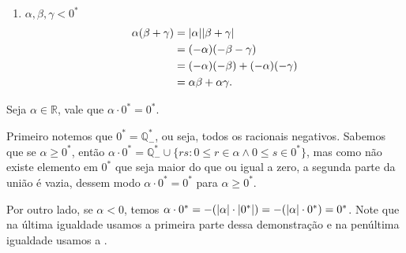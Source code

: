 \documentclass[../main.tex]{subfiles}
\begin{document}
\begin{dem}
\begin{enumerate}
        \item $\alpha,\beta,\gamma < 0^*$
        \begin{align*}
            \alpha(\beta+\gamma) &= \abs{\alpha}\abs{\beta+\gamma} \\
            &= (-\alpha)(-\beta-\gamma) \\
            &= (-\alpha)(-\beta) + (-\alpha)(-\gamma) \\
            &= \alpha\beta + \alpha\gamma.
        \end{align*}
    \end{enumerate}
\end{dem}

\begin{teo}
    Seja $\alpha \in \mathbb{R}$, vale que $\alpha \cdot 0^* = 0^*$.
\end{teo}
\begin{dem}
    Primeiro notemos que $0^* = \mathbb{Q}_{-}^*$, ou seja, todos os racionais negativos. Sabemos que se $\alpha \geq 0^*$, 
    então $\alpha \cdot 0^* = \mathbb{Q}_{-}^* \cup \{ rs : 0 \leq r \in \alpha \land 0 \leq s \in 0^* \}$, mas como não existe elemento em $0^*$ que seja maior do que ou igual a zero, a segunda parte da união é vazia, dessem modo $\alpha \cdot 0^* = 0^*$ para $\alpha \geq 0^*$.

    Por outro lado, se $\alpha < 0$, temos $\alpha \cdot 0^* = -(\abs{\alpha} \cdot \abs{0^*}) = -(\abs{\alpha} \cdot 0^*) = 0^*$. Note que na última igualdade usamos a primeira parte dessa demonstração e na penúltima igualdade usamos a .
\end{dem}
\end{document}
